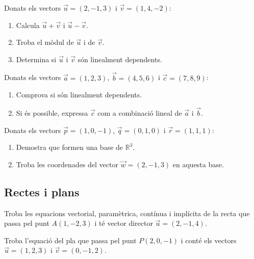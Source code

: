 \documentclass[12pt]{article}
\begin{document}
\begin{exercici}
Donats els vectors $\vec{u} = (2, -1, 3)$ i $\vec{v} = (1, 4, -2)$:
\begin{enumerate}[label=\alph*)]
    \item Calcula $\vec{u} + \vec{v}$ i $\vec{u} - \vec{v}$.
    \item Troba el mòdul de $\vec{u}$ i de $\vec{v}$.
    \item Determina si $\vec{u}$ i $\vec{v}$ són linealment dependents.
\end{enumerate}
\end{exercici}

\begin{exercici}
Donats els vectors $\vec{a} = (1, 2, 3)$, $\vec{b} = (4, 5, 6)$ i $\vec{c} = (7, 8, 9)$:
\begin{enumerate}[label=\alph*)]
    \item Comprova si són linealment dependents.
    \item Si és possible, expressa $\vec{c}$ com a combinació lineal de $\vec{a}$ i $\vec{b}$.
\end{enumerate}
\end{exercici}

\begin{exercici}
Donats els vectors $\vec{p} = (1, 0, -1)$, $\vec{q} = (0, 1, 0)$ i $\vec{r} = (1, 1, 1)$:
\begin{enumerate}[label=\alph*)]
    \item Demostra que formen una base de $\mathbb{R}^3$.
    \item Troba les coordenades del vector $\vec{w} = (2, -1, 3)$ en aquesta base.
\end{enumerate}
\end{exercici}

\subsection{Rectes i plans}

\begin{exercici}
Troba les equacions vectorial, paramètrica, contínua i implícita de la recta que passa pel punt $A(1,-2,3)$ i té vector director $\vec{u}=(2,-1,4)$.
\end{exercici}

\begin{exercici}
Troba l'equació del pla que passa pel punt $P(2,0,-1)$ i conté els vectors $\vec{u}=(1,2,3)$ i $\vec{v}=(0,-1,2)$.
\end{exercici}
\end{document}
